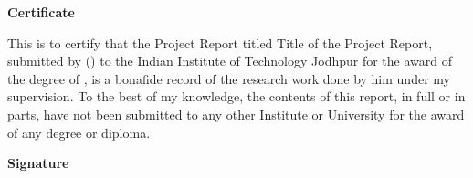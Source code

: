 \begin{flushright}
\huge{\textbf{Certificate}}
\end{flushright}
This is to certify that the Project Report titled Title of the Project Report, submitted by \authorname{}(\rn{}) to the Indian Institute of Technology Jodhpur for the award of the degree of \degree{}, is a bonafide record of the research work done by him under my supervision. To the best of my knowledge, the contents of this report, in full or in parts, have not been submitted to any other Institute or University for the award of any degree or diploma.
\vspace{2cm}
\begin{flushright}
\large{\textbf{Signature}}\\
\supname\\
\end{flushright}